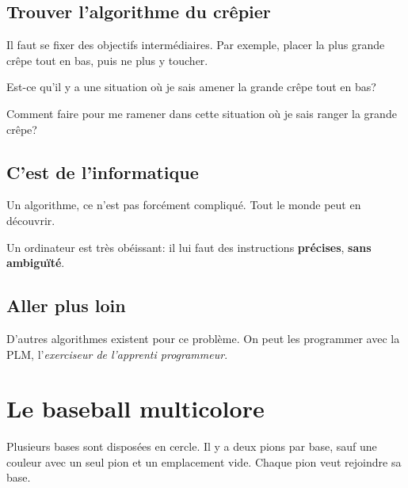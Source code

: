 \documentclass[a7paper,pagesize,DIV=14,10pt]{scrbook}
\begin{document}
\newpage
\subsection*{Trouver l'algorithme du crêpier}
\vspace{-.5\baselineskip}

Il faut se fixer des objectifs intermédiaires. Par exemple, placer la
plus grande crêpe tout en bas, puis ne plus y toucher.

\smallskip
Est-ce qu'il y a une situation où je sais amener la grande crêpe tout en bas?

\smallskip
Comment faire pour me ramener dans cette situation où je sais ranger la grande crêpe?

\vspace{-.6\baselineskip}
\subsection*{C'est de l'informatique}
\vspace{-.5\baselineskip}

Un algorithme, ce n'est pas forcément compliqué. Tout le monde peut en découvrir.

\smallskip
Un ordinateur est très obéissant: il lui faut des instructions
\textbf{précises}, \textbf{sans ambiguïté}.

\vspace{-.6\baselineskip}
\subsection*{Aller plus loin}
\vspace{-.5\baselineskip}
D'autres algorithmes existent pour ce problème. On peut les programmer
avec la PLM, l'\textit{exerciseur de l'apprenti programmeur}.%

\newpage
\section*{Le baseball multicolore}


\vspace{-.5\baselineskip} %
Plusieurs bases sont disposées en cercle.  Il y a deux pions par base,
sauf une couleur avec un seul pion et un emplacement vide.  Chaque
pion veut rejoindre sa base.
\end{document}
